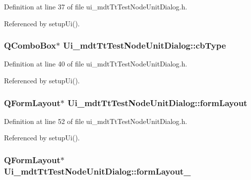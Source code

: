 Definition at line 37 of file ui\-\_\-mdt\-Tt\-Test\-Node\-Unit\-Dialog.\-h.



Referenced by setup\-Ui().

\hypertarget{class_ui__mdt_tt_test_node_unit_dialog_abffeab8f06517270cc76e7f79cb8abc7}{
\subsubsection[{cb\-Type}]{\setlength{\rightskip}{0pt plus 5cm}Q\-Combo\-Box$\ast$ Ui\-\_\-mdt\-Tt\-Test\-Node\-Unit\-Dialog\-::cb\-Type}}\label{class_ui__mdt_tt_test_node_unit_dialog_abffeab8f06517270cc76e7f79cb8abc7}


Definition at line 40 of file ui\-\_\-mdt\-Tt\-Test\-Node\-Unit\-Dialog.\-h.



Referenced by setup\-Ui().

\hypertarget{class_ui__mdt_tt_test_node_unit_dialog_a1509ad244b3d1fa72d05270ecadda8d2}{
\subsubsection[{form\-Layout}]{\setlength{\rightskip}{0pt plus 5cm}Q\-Form\-Layout$\ast$ Ui\-\_\-mdt\-Tt\-Test\-Node\-Unit\-Dialog\-::form\-Layout}}\label{class_ui__mdt_tt_test_node_unit_dialog_a1509ad244b3d1fa72d05270ecadda8d2}


Definition at line 52 of file ui\-\_\-mdt\-Tt\-Test\-Node\-Unit\-Dialog.\-h.



Referenced by setup\-Ui().

\hypertarget{class_ui__mdt_tt_test_node_unit_dialog_a4126386f8db5d7c75334b419d51fbaf0}{
\subsubsection[{form\-Layout\-\_\-2}]{\setlength{\rightskip}{0pt plus 5cm}Q\-Form\-Layout$\ast$ Ui\-\_\-mdt\-Tt\-Test\-Node\-Unit\-Dialog\-::form\-Layout\-\_}}\label{class_ui__mdt_tt_test_node_unit_dialog_a4126386f8db5d7c75334b419d51fbaf0}


